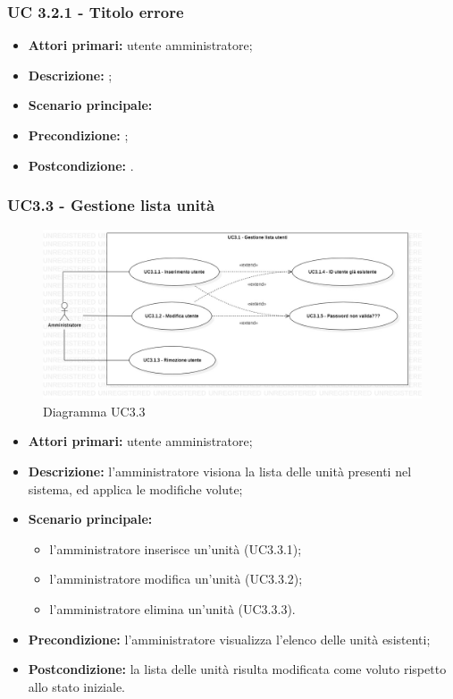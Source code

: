 \subsubsection{UC 3.2.1 - Titolo errore}
\begin{itemize}
	\item \textbf{Attori primari:} utente amministratore;
	\item \textbf{Descrizione:} ;
	\item \textbf{Scenario principale:} 
	\item \textbf{Precondizione:} ;
	\item \textbf{Postcondizione:} .
\end{itemize}

\subsubsection{UC3.3 - Gestione lista unità}
	\begin{center}
		\begin{figure}[h!]
			\includegraphics[width=15cm]{images/uc3.1.jpg}
			\caption{Diagramma UC3.3}
		\end{figure}
	\end{center}
	\begin{itemize}
		\item \textbf{Attori primari:} utente amministratore;
		\item \textbf{Descrizione:} l'amministratore visiona la lista delle unità presenti nel sistema, ed applica le modifiche volute;
		\item \textbf{Scenario principale:} 
			\begin{itemize}
				\item l'amministratore inserisce un'unità (UC3.3.1);
				\item l'amministratore modifica un'unità (UC3.3.2);
				\item l'amministratore elimina un'unità (UC3.3.3).
			\end{itemize}
		\item \textbf{Precondizione:} l'amministratore visualizza l'elenco delle unità esistenti;
		\item \textbf{Postcondizione:} la lista delle unità risulta modificata come voluto rispetto allo stato iniziale.
	\end{itemize}

